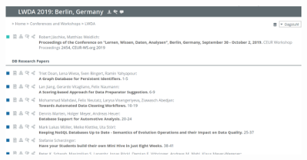 \documentclass[xcolor={svgnames}]{beamer}
\makeatletter
\newcommand*{\currentname}{\@currentlabelname}
\makeatother
\begin{document}
\begin{frame}{\currentname}\linespread{1.5}
    \begin{figure}
      \begin{center}
        \includegraphics[width=\textwidth,height=0.8\textheight,keepaspectratio]{img/dblp_proceeding.png}
      \end{center}
    \end{figure}
\end{frame}

\end{document}
